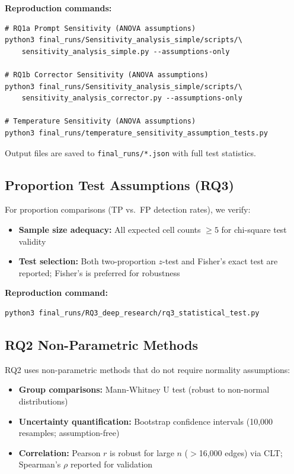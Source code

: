 \textbf{Reproduction commands:}
\begin{verbatim}
# RQ1a Prompt Sensitivity (ANOVA assumptions)
python3 final_runs/Sensitivity_analysis_simple/scripts/\
    sensitivity_analysis_simple.py --assumptions-only

# RQ1b Corrector Sensitivity (ANOVA assumptions)
python3 final_runs/Sensitivity_analysis_simple/scripts/\
    sensitivity_analysis_corrector.py --assumptions-only

# Temperature Sensitivity (ANOVA assumptions)
python3 final_runs/temperature_sensitivity_assumption_tests.py
\end{verbatim}

Output files are saved to \texttt{final\_runs/*.json} with full test statistics.

\subsection{Proportion Test Assumptions (RQ3)}

For proportion comparisons (TP vs.\ FP detection rates), we verify:
\begin{itemize}[noitemsep]
    \item \textbf{Sample size adequacy:} All expected cell counts $\geq 5$ for chi-square test validity
    \item \textbf{Test selection:} Both two-proportion $z$-test and Fisher's exact test are reported; Fisher's is preferred for robustness
\end{itemize}

\textbf{Reproduction command:}
\begin{verbatim}
python3 final_runs/RQ3_deep_research/rq3_statistical_test.py
\end{verbatim}

\subsection{RQ2 Non-Parametric Methods}

RQ2 uses non-parametric methods that do not require normality assumptions:
\begin{itemize}[noitemsep]
    \item \textbf{Group comparisons:} Mann-Whitney U test (robust to non-normal distributions)
    \item \textbf{Uncertainty quantification:} Bootstrap confidence intervals (10,000 resamples; assumption-free)
    \item \textbf{Correlation:} Pearson $r$ is robust for large $n$ ($>$16,000 edges) via CLT; Spearman's $\rho$ reported for validation
\end{itemize}

